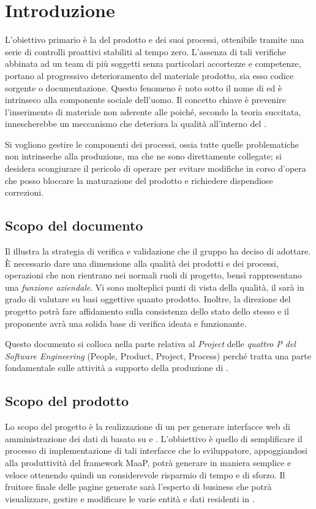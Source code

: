 \section{Introduzione}
 L'obiettivo primario è la  del prodotto e dei suoi processi, ottenibile tramite una serie di controlli proattivi stabiliti al tempo zero. L'assenza di tali verifiche abbinata ad un team di più soggetti senza particolari accortezze e competenze, portano al progressivo deterioramento del materiale prodotto, sia esso codice sorgente o documentazione. Questo fenomeno è noto sotto il nome di  ed è intrinseco alla componente sociale dell'uomo. Il concetto chiave è prevenire l'inserimento di materiale non aderente alle \NormeDiProgetto poiché, secondo la teoria succitata, innescherebbe un meccanismo che deteriora la qualità all'interno del .

Si vogliono gestire le componenti  dei processi, ossia tutte quelle problematiche non intrinseche alla produzione, ma che ne sono direttamente collegate; si desidera scongiurare il pericolo di operare  per evitare modifiche in corso d'opera che posso bloccare la  maturazione del prodotto e richiedere dispendiose correzioni.

\subsection{Scopo del documento}
Il \DocTitle{} illustra la strategia di verifica e validazione che il gruppo \GroupName{} ha deciso di adottare. È necessario dare una dimensione alla qualità dei prodotti e dei processi, operazioni che non rientrano nei normali ruoli di progetto, bensì rappresentano una \emph{funzione aziendale}. Vi sono molteplici punti di vista della qualità, il  sarà in grado di valutare su basi oggettive quanto prodotto. Inoltre, la direzione del progetto potrà fare affidamento sulla consistenza dello stato dello stesso e il proponente avrà una solida base di verifica ideata e funzionante.

Questo documento si colloca nella parte relativa al \emph{Project} delle \emph{quattro P del Software Engineering} (People, Product, Project, Process) perché tratta una parte fondamentale sulle attività a supporto della produzione di \ProjectName{}.

\subsection{Scopo del prodotto}
Lo scopo del progetto è la realizzazione di un  per generare interfacce web di amministrazione dei dati di  basato su   e . L'obbiettivo è quello di semplificare il processo di implementazione di tali interfacce che lo sviluppatore, appoggiandosi alla produttività del framework MaaP, potrà generare in maniera semplice e veloce ottenendo quindi un considerevole risparmio di tempo e di sforzo. Il fruitore finale delle pagine generate sarà l'esperto di business che potrà visualizzare, gestire e modificare le varie entità e dati residenti in .

